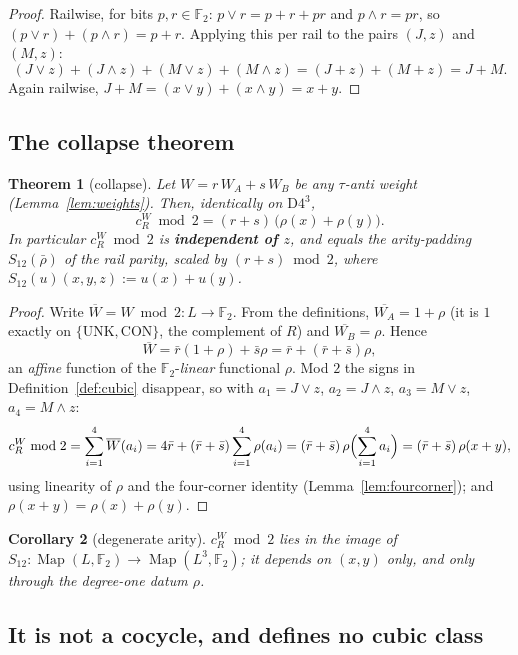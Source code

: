 \documentclass[11pt]{article}
\newtheorem{theorem}{Theorem}[section]
\newtheorem{corollary}[theorem]{Corollary}
\theoremstyle{definition}
\theoremstyle{remark}
\newcommand{\F}{\mathbb{F}}
\newcommand{\UNK}{\mathrm{UNK}}
\newcommand{\CON}{\mathrm{CON}}
\newcommand{\Dfour}{\mathrm{D4}}
\newcommand{\Map}{\operatorname{Map}}
\newcommand{\cR}{c_R^W}
\newcommand{\WA}{W_{\!A}}
\newcommand{\WB}{W_{\!B}}
\begin{document}
\begin{proof}
Railwise, for bits $p,r\in\F_2$: $p\vee r=p+r+pr$ and $p\wedge r=pr$, so $(p\vee r)+(p\wedge r)=p+r$. Applying this per rail to the pairs $(J,z)$ and $(M,z)$:
\[
(J\vee z)+(J\wedge z)+(M\vee z)+(M\wedge z)=(J+z)+(M+z)=J+M .
\]
Again railwise, $J+M=(x\vee y)+(x\wedge y)=x+y$.
\end{proof}

\subsection{The collapse theorem}

\begin{theorem}[collapse]\label{thm:collapse}
Let $W=r\,\WA+s\,\WB$ be any $\tau$-anti weight (Lemma~\ref{lem:weights}). Then, identically on $\Dfour^3$,
\[
\cR \bmod 2 = (r+s)\,\bigl(\rho(x)+\rho(y)\bigr).
\]
In particular $\cR\bmod2$ is \textbf{independent of $z$}, and equals the arity-padding $S_{12}(\bar\rho)$ of the rail parity, scaled by $(r{+}s)\bmod2$, where $S_{12}(u)(x,y,z):=u(x)+u(y)$.
\end{theorem}

\begin{proof}
Write $\overline W=W\bmod2:L\to\F_2$. From the definitions, $\overline{\WA}=1+\rho$ (it is $1$ exactly on $\{\UNK,\CON\}$, the complement of $R$) and $\overline{\WB}=\rho$. Hence
\[
\overline W=\bar r(1+\rho)+\bar s\rho=\bar r+(\bar r+\bar s)\rho,
\]
an \emph{affine} function of the $\F_2$-\emph{linear} functional $\rho$. Mod $2$ the signs in Definition~\ref{def:cubic} disappear, so with $a_1=J\vee z$, $a_2=J\wedge z$, $a_3=M\vee z$, $a_4=M\wedge z$:
\[
\cR\bmod2=\sum_{i=1}^4\overline W(a_i)=4\bar r+(\bar r+\bar s)\sum_{i=1}^4\rho(a_i)
=(\bar r+\bar s)\,\rho\Bigl(\sum_{i=1}^4 a_i\Bigr)
=(\bar r+\bar s)\,\rho(x+y),
\]
using linearity of $\rho$ and the four-corner identity (Lemma~\ref{lem:fourcorner}); and $\rho(x+y)=\rho(x)+\rho(y)$.
\end{proof}

\begin{corollary}[degenerate arity]\label{cor:degenerate}
$\cR\bmod2$ lies in the image of $S_{12}:\Map(L,\F_2)\to\Map(L^3,\F_2)$; it depends on $(x,y)$ only, and only through the degree-one datum $\rho$.
\end{corollary}

\subsection{It is not a cocycle, and defines no cubic class}\label{sec:notcocycle}
\end{document}
